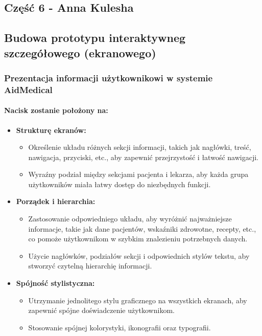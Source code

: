 \begin{center}
  \section{Część 6 - Anna Kulesha}
  \subsection{Budowa prototypu interaktywneg szczegółowego (ekranowego)}
\end{center}

\subsubsection{Prezentacja informacji użytkownikowi w systemie AidMedical}

\paragraph{Nacisk zostanie położony na:}
\begin{itemize}
  \item \textbf{Strukturę ekranów:}
    \begin{itemize}
      \item Określenie układu różnych sekcji informacji, takich jak nagłówki, treść, nawigacja, przyciski, etc., aby zapewnić przejrzystość i łatwość nawigacji.
      \item Wyraźny podział między sekcjami pacjenta i lekarza, aby każda grupa użytkowników miała łatwy dostęp do niezbędnych funkcji.
    \end{itemize}
  \item \textbf{Porządek i hierarchia:}
    \begin{itemize}
      \item Zastosowanie odpowiedniego układu, aby wyróżnić najważniejsze informacje, takie jak dane pacjentów, wskaźniki zdrowotne, recepty, etc., co pomoże użytkownikom w szybkim znalezieniu potrzebnych danych.
      \item Użycie nagłówków, podziałów sekcji i odpowiednich stylów tekstu, aby stworzyć czytelną hierarchię informacji.
    \end{itemize}
  \item \textbf{Spójność stylistyczna:}
    \begin{itemize}
      \item Utrzymanie jednolitego stylu graficznego na wszystkich ekranach, aby zapewnić spójne doświadczenie użytkownikom.
      \item Stosowanie spójnej kolorystyki, ikonografii oraz typografii.
    \end{itemize}
\end{itemize}

